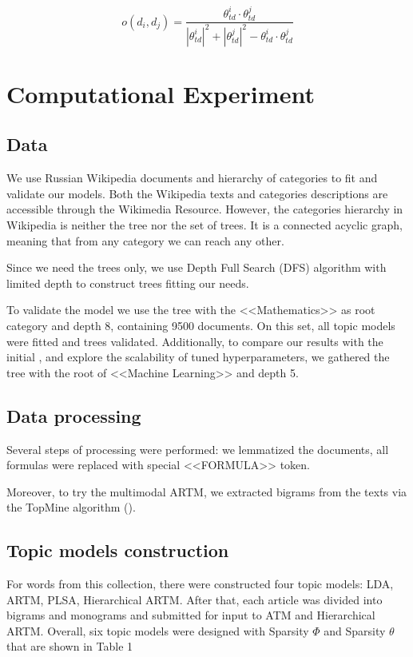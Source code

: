 \documentclass[12pt,twoside]{article}
\begin{document}
	\begin{equation}
	o(d_i, d_j) = \frac{\theta_{td}^i\cdot \theta_{td}^j}{|\theta_{td}^i|^2+|\theta_{td}^j|^2 - \theta_{td}^i\cdot \theta_{td}^j}
	\end{equation}
	
	\section{Computational Experiment}
	
	\subsection{Data}
	
	We use Russian Wikipedia documents and  hierarchy of categories to fit and validate our models. Both the Wikipedia texts and categories descriptions are accessible through the Wikimedia Resource. However, the categories hierarchy in Wikipedia is neither the tree nor the set of trees. It is a connected acyclic graph, meaning that from any category we can reach any other. 
	
	Since we need the trees only, we use Depth Full Search (DFS) algorithm with limited depth to construct trees fitting our needs. 
	
	To validate the model we use the tree with the <<Mathematics>> as root category and depth 8, containing 9500 documents. On this set, all topic models were fitted and trees validated.
	Additionally, to compare our results with the initial \cite{conf/icde/KoutrikaLS15}, and explore the scalability of tuned hyperparameters, we gathered the tree with the root of <<Machine Learning>> and depth 5. 
	
	\subsection{Data processing}
	
	Several steps of processing were performed: we lemmatized the documents, all formulas were replaced with special <<FORMULA>> token.
	
	Moreover, to try the multimodal ARTM, we extracted bigrams from the texts via the TopMine algorithm (\cite{kishky14topmine}).
	
	\subsection{Topic models construction}
	For words from this collection, there were constructed four topic models: LDA, ARTM, PLSA, Hierarchical ARTM. After that, each article was divided into bigrams and monograms and submitted for input to ATM and Hierarchical ARTM. Overall, six topic models were designed with Sparsity $\Phi$ and Sparsity $\theta$ that are shown in Table 1
	
\end{document}
